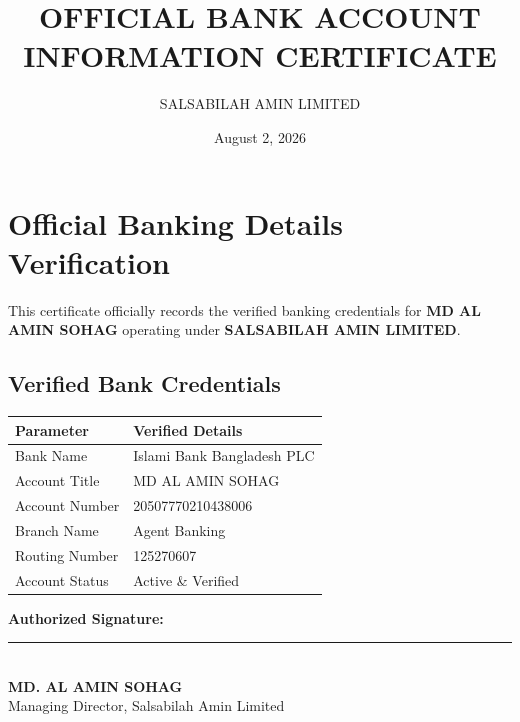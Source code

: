 \documentclass[11pt,a4paper]{article}
\title{\textbf{OFFICIAL BANK ACCOUNT INFORMATION CERTIFICATE}}
\author{SALSABILAH AMIN LIMITED}
\date{August 2, 2026}
\begin{document}
\maketitle

\section*{Official Banking Details Verification}
This certificate officially records the verified banking credentials for \textbf{MD AL AMIN SOHAG} operating under \textbf{SALSABILAH AMIN LIMITED}.

\subsection*{Verified Bank Credentials}
\begin{center}
\begin{tabular}{|l|l|}
\hline
\textbf{Parameter} & \textbf{Verified Details} \\
\hline
Bank Name & Islami Bank Bangladesh PLC \\
Account Title & MD AL AMIN SOHAG \\
Account Number & 20507770210438006 \\
Branch Name & Agent Banking \\
Routing Number & 125270607 \\
Account Status & Active \& Verified \\
\hline
\end{tabular}
\end{center}

\vspace{2cm}
\noindent
\textbf{Authorized Signature:}\\[1.5cm]
\rule{6cm}{0.4pt}\\
\textbf{MD. AL AMIN SOHAG}\\
Managing Director, Salsabilah Amin Limited
\end{document}
